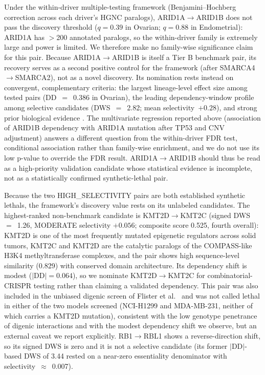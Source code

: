 \documentclass[11pt,a4paper]{article}
\begin{document}
Under the within-driver multiple-testing framework (Benjamini--Hochberg correction across each driver's HGNC paralogs), ARID1A$\rightarrow$ARID1B does not pass the discovery threshold ($q=0.39$ in Ovarian; $q=0.88$ in Endometrial): ARID1A has $>$200 annotated paralogs, so the within-driver family is extremely large and power is limited. We therefore make no family-wise significance claim for this pair. Because ARID1A$\rightarrow$ARID1B is itself a Tier B benchmark pair, its recovery serves as a second positive control for the framework (after SMARCA4$\rightarrow$SMARCA2), not as a novel discovery. Its nomination rests instead on convergent, complementary criteria: the largest lineage-level effect size among tested pairs (DD~$=$~0.386 in Ovarian), the leading dependency-window profile among selective candidates (DWS~$=$~2.82; mean selectivity~$+0.28$), and strong prior biological evidence \cite{Helming2014}. The multivariate regression reported above (association of ARID1B dependency with ARID1A mutation after TP53 and CNV adjustment) answers a different question from the within-driver FDR test, conditional association rather than family-wise enrichment, and we do not use its low p-value to override the FDR result. ARID1A$\rightarrow$ARID1B should thus be read as a high-priority validation candidate whose statistical evidence is incomplete, not as a statistically confirmed synthetic-lethal pair.

Because the two HIGH\_SELECTIVITY pairs are both established synthetic lethals, the framework's discovery value rests on its unlabeled candidates. The highest-ranked non-benchmark candidate is KMT2D$\rightarrow$KMT2C (signed DWS~$=$~1.26, MODERATE selectivity $+0.056$; composite score 0.525, fourth overall): KMT2D is one of the most frequently mutated epigenetic regulators across solid tumors, KMT2C and KMT2D are the catalytic paralogs of the COMPASS-like H3K4 methyltransferase complexes, and the pair shows high sequence-level similarity (0.829) with conserved domain architecture. Its dependency shift is modest ($|$DD$| = 0.064$), so we nominate KMT2D$\rightarrow$KMT2C for combinatorial-CRISPR testing rather than claiming a validated dependency. This pair was also included in the unbiased digenic screen of Flister et al.\ \cite{Flister2025} and was not called lethal in either of the two models screened (NCI-H1299 and MDA-MB-231, neither of which carries a KMT2D mutation), consistent with the low genotype penetrance of digenic interactions and with the modest dependency shift we observe, but an external caveat we report explicitly. RB1$\rightarrow$RBL1 shows a reverse-direction shift, so its signed DWS is zero and it is not a selective candidate (its former $|$DD$|$-based DWS of 3.44 rested on a near-zero essentiality denominator with selectivity~$\approx$~0.007).
\end{document}
